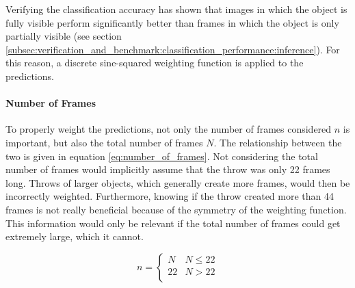 Verifying the classification accuracy has shown that images in which the object is fully visible perform significantly better than frames in which the object is only partially visible (see section \ref{subsec:verification_and_benchmark:classification_performance:inference}). %
For this reason, a discrete sine-squared weighting function is applied to the predictions.

\paragraph{Number of Frames}
To properly weight the predictions, not only the number of frames considered $n$ is important, but also the total number of frames $N$.
The relationship between the two is given in equation \ref{eq:number_of_frames}.
Not considering the total number of frames would implicitly assume that the throw was only \num{22} frames long.
Throws of larger objects, which generally create more frames, would then be incorrectly weighted.
Furthermore, knowing if the throw created more than \num{44} frames is not really beneficial because of the symmetry of the weighting function.
This information would only be relevant if the total number of frames could get extremely large, which it cannot.

\begin{equation}
  n =
  \begin{cases}
    N & N \leq 22 \\
    22 & N > 22 \\
  \end{cases}
  \label{eq:number_of_frames}
\end{equation}

